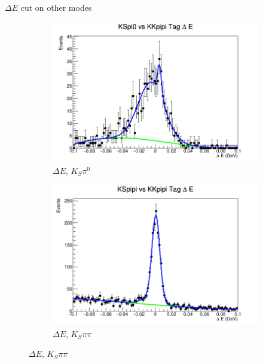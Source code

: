 \documentclass{beamer}
\begin{document}
\begin{frame}{$\Delta E$ cut on other modes}
\begin{figure}
\begin{subfigure}{0.4\textwidth}
      \includegraphics[width=\textwidth]{KSpi0TagDeltaE.png}
      \caption{$\Delta E$, $K_S\pi^0$}
    \end{subfigure}%
    \begin{subfigure}{0.4\textwidth}
      \centering
      \includegraphics[width=\textwidth]{KSpipiTagDeltaE.png}
      \caption{$\Delta E$, $K_S\pi\pi$}
    \end{subfigure}
  \end{figure}
\end{frame}
\end{document}
